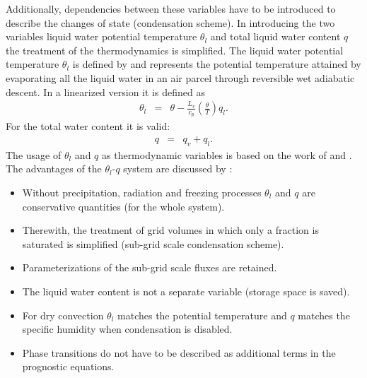 \documentclass[11pt,a4paper]{scrartcl}
\begin{document}
Additionally, dependencies between these variables have to be introduced to describe the changes of state (condensation scheme).
\newline
In introducing the two variables liquid water potential temperature $\theta_{l}$ and total liquid water content $q$ the treatment of the 
thermodynamics is simplified. The liquid water potential temperature $\theta_{l}$ is defined by \cite{betts73} and represents the potential 
temperature attained by evaporating all the liquid water in an air parcel through reversible wet adiabatic descent. In a linearized version 
it is defined as 
\begin{eqnarray}
 \theta_{l} & = & \theta -\frac{L_{v}}{c_{p}}\left(\frac{\theta}{T}\right)q_{l}.
 \label{eq:theta_l}
\end{eqnarray}
For the total water content it is valid:
\begin{eqnarray}
 q & = & q_{v}+q_{l}.
 \label{eq:q}
\end{eqnarray}
The usage of $\theta_{l}$ and $q$ as thermodynamic variables is based on the work of \cite{ogura63} and \cite{orville65}. The advantages of the 
$\theta_l$-$q$ system are discussed by \cite{deardorff76}:
\begin{itemize}
 \item Without precipitation, radiation and freezing processes $\theta_{l}$ and $q$ are conservative quantities (for the whole system).
 \item Therewith, the treatment of grid volumes in which only a fraction is saturated is simplified (sub-grid scale condensation scheme).
 \item Parameterizations of the sub-grid scale fluxes are retained. 
 \item The liquid water content is not a separate variable (storage space is saved).
 \item For dry convection $\theta_{l}$ matches the potential temperature and $q$ matches the specific humidity when condensation is disabled.
 \item Phase transitions do not have to be described as additional terms in the prognostic equations.
\end{itemize}
\end{document}
